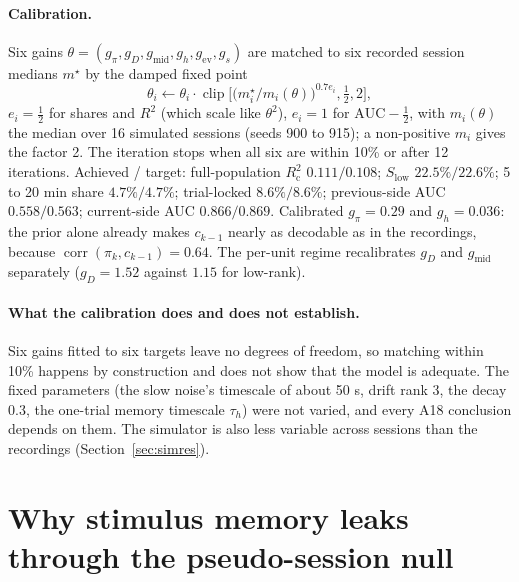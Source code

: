\documentclass[11pt]{article}
\newcommand{\corr}{\operatorname{corr}}
\newcommand{\Rc}{R^2_{\mathrm{c}}}
\begin{document}
\paragraph{Calibration.} Six gains $\theta = (g_\pi, g_D, g_{\mathrm{mid}}, g_h, g_{\mathrm{ev}}, g_s)$ are matched to
six recorded session medians $m^\star$ by the damped fixed point
\begin{equation}
\theta_i \leftarrow \theta_i \cdot \operatorname{clip}\!\Big[\big(m^\star_i / m_i(\theta)\big)^{0.7 e_i}, \tfrac12, 2\Big],
\end{equation}
$e_i = \frac12$ for shares and $R^2$ (which scale like $\theta^2$), $e_i = 1$ for $\mathrm{AUC} - \frac12$, with
$m_i(\theta)$ the median over 16 simulated sessions (seeds 900 to 915); a non-positive $m_i$ gives the factor 2. The
iteration stops when all six are within 10\% or after 12 iterations. Achieved / target: full-population
$\Rc$ $0.111/0.108$; $S_{\mathrm{low}}$ $22.5\%/22.6\%$; 5 to 20 min share $4.7\%/4.7\%$; trial-locked $8.6\%/8.6\%$;
previous-side AUC $0.558/0.563$; current-side AUC $0.866/0.869$. Calibrated $g_\pi = 0.29$ and $g_h = 0.036$: the
prior alone already makes $c_{k-1}$ nearly as decodable as in the recordings, because $\corr(\pi_k, c_{k-1}) = 0.64$.
The per-unit regime recalibrates $g_D$ and $g_{\mathrm{mid}}$ separately ($g_D = 1.52$ against $1.15$ for low-rank).

\paragraph{What the calibration does and does not establish.} Six gains fitted to six targets leave no degrees of
freedom, so matching within 10\% happens by construction and does not show that the model is adequate. The fixed
parameters (the slow noise's timescale of about 50 s, drift rank 3, the decay 0.3, the one-trial memory timescale
$\tau_h$) were not varied, and every A18 conclusion depends on them. The simulator is also less variable across
sessions than the recordings (Section~\ref{sec:simres}).

\section{Why stimulus memory leaks through the pseudo-session null}
\label{sec:leak}
\end{document}
